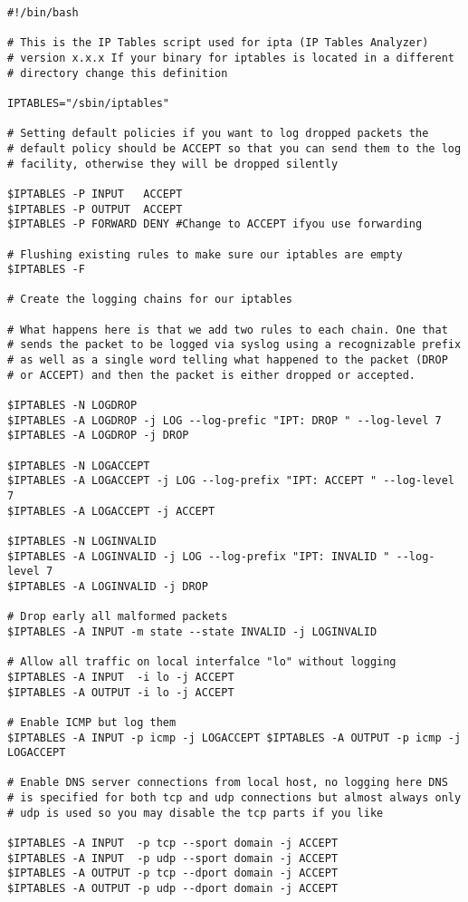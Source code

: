 \documentclass[english,twoside,openright,a4paper,12pt]{article}
\begin{document}
\scriptsize \begin{verbatim}
#!/bin/bash

# This is the IP Tables script used for ipta (IP Tables Analyzer)
# version x.x.x If your binary for iptables is located in a different
# directory change this definition

IPTABLES="/sbin/iptables"

# Setting default policies if you want to log dropped packets the
# default policy should be ACCEPT so that you can send them to the log
# facility, otherwise they will be dropped silently

$IPTABLES -P INPUT   ACCEPT
$IPTABLES -P OUTPUT  ACCEPT
$IPTABLES -P FORWARD DENY #Change to ACCEPT ifyou use forwarding

# Flushing existing rules to make sure our iptables are empty 
$IPTABLES -F

# Create the logging chains for our iptables

# What happens here is that we add two rules to each chain. One that
# sends the packet to be logged via syslog using a recognizable prefix
# as well as a single word telling what happened to the packet (DROP
# or ACCEPT) and then the packet is either dropped or accepted.

$IPTABLES -N LOGDROP
$IPTABLES -A LOGDROP -j LOG --log-prefic "IPT: DROP " --log-level 7
$IPTABLES -A LOGDROP -j DROP

$IPTABLES -N LOGACCEPT
$IPTABLES -A LOGACCEPT -j LOG --log-prefix "IPT: ACCEPT " --log-level 7 
$IPTABLES -A LOGACCEPT -j ACCEPT

$IPTABLES -N LOGINVALID
$IPTABLES -A LOGINVALID -j LOG --log-prefix "IPT: INVALID " --log-level 7 
$IPTABLES -A LOGINVALID -j DROP

# Drop early all malformed packets
$IPTABLES -A INPUT -m state --state INVALID -j LOGINVALID

# Allow all traffic on local interfalce "lo" without logging 
$IPTABLES -A INPUT  -i lo -j ACCEPT
$IPTABLES -A OUTPUT -i lo -j ACCEPT

# Enable ICMP but log them
$IPTABLES -A INPUT -p icmp -j LOGACCEPT $IPTABLES -A OUTPUT -p icmp -j LOGACCEPT

# Enable DNS server connections from local host, no logging here DNS
# is specified for both tcp and udp connections but almost always only
# udp is used so you may disable the tcp parts if you like

$IPTABLES -A INPUT  -p tcp --sport domain -j ACCEPT
$IPTABLES -A INPUT  -p udp --sport domain -j ACCEPT
$IPTABLES -A OUTPUT -p tcp --dport domain -j ACCEPT
$IPTABLES -A OUTPUT -p udp --dport domain -j ACCEPT


\end{verbatim}
\end{document}
